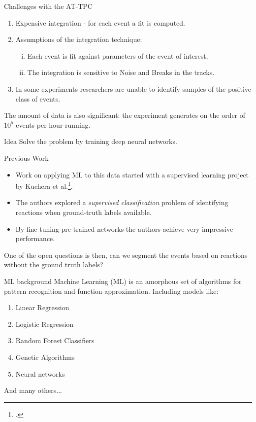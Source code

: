 \documentclass{beamer}
\begin{document}
\begin{frame}[t]{Challenges with the AT-TPC}
	\begin{enumerate}[I]
		\item Expensive integration - for each event a fit is computed.
		\item Assumptions of the integration technique: 
			\begin{enumerate}[(i)]
				\item Each event is fit against parameters of the event of interest,
				\item The integration is sensitive to Noise and Breaks in the tracks.
			\end{enumerate}
		\item In some experiments researchers are unable to identify samples of the positive class of events.
	\end{enumerate}
	The amount of data is also significant: the experiment generates on the order of $10^5$ events per hour running.
	\begin{block}{Idea}
		Solve the problem by training deep neural networks.
	\end{block}
\end{frame}

\begin{frame}[t]{Previous Work}
	\begin{itemize}
		\item Work on applying ML to this data started with a supervised learning project by Kuchera et al.\footcite{Kuchera2019}.
		\item The authors explored a \textit{supervised classification} problem of identifying reactions when ground-truth labels available.
		\item By fine tuning pre-trained networks the authors achieve very impressive performance.
	\end{itemize}
	One of the open questions is then, can we segment the events based on reactions without the ground truth labels?
\end{frame}

\begin{frame}[t]{ML background}
	Machine Learning (ML) is an amorphous set of algorithms for pattern recognition and function approximation. Including models like:
	\begin{enumerate}[I]
		\item Linear Regression
		\item Logistic Regression
		\item Random Forest Classifiers
		\item Genetic Algorithms 
		\item Neural networks
	\end{enumerate}
	And many others...
\end{frame}
\end{document}
